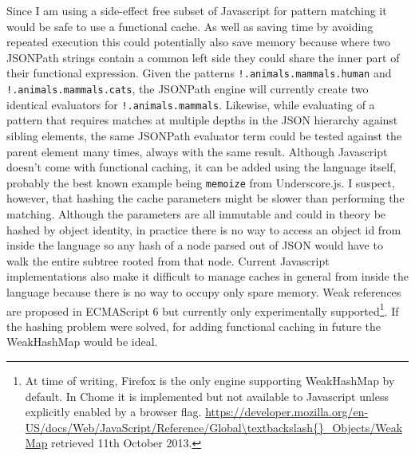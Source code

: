 \documentclass[]{article}
\begin{document}
Since I am using a side-effect free subset of Javascript for pattern
matching it would be safe to use a functional cache. As well as saving
time by avoiding repeated execution this could potentially also save
memory because where two JSONPath strings contain a common left side
they could share the inner part of their functional expression. Given
the patterns \texttt{!.animals.mammals.human} and
\texttt{!.animals.mammals.cats}, the JSONPath engine will currently
create two identical evaluators for \texttt{!.animals.mammals}.
Likewise, while evaluating of a pattern that requires matches at
multiple depths in the JSON hierarchy against sibling elements, the same
JSONPath evaluator term could be tested against the parent element many
times, always with the same result. Although Javascript doesn't come
with functional caching, it can be added using the language itself,
probably the best known example being \texttt{memoize} from
Underscore.js. I suspect, however, that hashing the cache parameters
might be slower than performing the matching. Although the parameters
are all immutable and could in theory be hashed by object identity, in
practice there is no way to access an object id from inside the language
so any hash of a node parsed out of JSON would have to walk the entire
subtree rooted from that node. Current Javascript implementations also
make it difficult to manage caches in general from inside the language
because there is no way to occupy only spare memory. Weak references are
proposed in ECMAScript 6 but currently only experimentally
supported\footnote{At time of writing, Firefox is the only engine
  supporting WeakHashMap by default. In Chome it is implemented but not
  available to Javascript unless explicitly enabled by a browser flag.
  \url{https://developer.mozilla.org/en-US/docs/Web/JavaScript/Reference/Global\textbackslash{}_Objects/WeakMap}
  retrieved 11th October 2013.}. If the hashing problem were solved, for
adding functional caching in future the WeakHashMap would be ideal.
\end{document}
